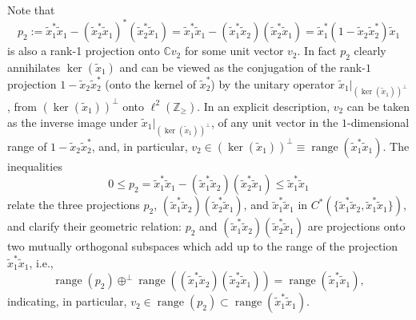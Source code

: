 \documentclass[11pt]{article}
\numberwithin{equation}{section}
\begin{document}
Note that
\[
p_{2}:=\tilde{x}_{1}^{\ast}\tilde{x}_{1}- ( \tilde{x}_{2}^{\ast}\tilde
{x}_{1} ) ^{\ast} ( \tilde{x}_{2}^{\ast}\tilde{x}_{1} )
=\tilde{x}_{1}^{\ast}\tilde{x}_{1}- ( \tilde{x}_{1}^{\ast}\tilde{x}%
_{2} ) ( \tilde{x}_{2}^{\ast}\tilde{x}_{1} ) =\tilde{x}%
_{1}^{\ast} ( 1-\tilde{x}_{2}\tilde{x}_{2}^{\ast} ) \tilde{x}_{1}%
\]
is also a rank-1 projection onto $\mathbb{C}v_{2}$ for some unit vector
$v_{2}$. In fact $p_{2}$ clearly annihilates $\ker ( \tilde{x}_{1} )
$ and can be viewed as the conjugation of the rank-$1$ projection $1-\tilde{x}_{2}\tilde{x}_{2}%
^{\ast}$ (onto the kernel of $\tilde{x}_{2}^{\ast}$) by the unitary
operator $\tilde{x}_{1}|_{( \ker( \tilde{x}_{1}))
^{\perp}}$, from $( \ker( \tilde{x}_{1})) ^{\perp}$
onto $\ell^{2}( \mathbb{Z}_{\geq}) $. In an explicit description, $v_{2}$
can be taken as the inverse image under $\tilde{x}_{1}|_{( \ker( \tilde{x}_{1})) ^{\perp}}$,
of any unit vector in the $1$-dimensional range of $1-\tilde{x}_{2}\tilde{x}%
_{2}^{\ast}$, and, in particular, $v_{2}\in( \ker( \tilde{x}
_{1})) ^{\perp}\equiv\operatorname{range}( \tilde{x}_{1}^{\ast}\tilde{x}_{1})$.
The inequalities
\[
0\leq p_{2}=\tilde{x}_{1}^{\ast}\tilde{x}_{1}-( \tilde{x}_{1}^{\ast
}\tilde{x}_{2}) ( \tilde{x}_{2}^{\ast}\tilde{x}_{1})
\leq\tilde{x}_{1}^{\ast}\tilde{x}_{1}
\]
relate the three projections $p_{2}$, $( \tilde{x}_{1}^{\ast}
\tilde{x}_{2}) ( \tilde{x}_{2}^{\ast}\tilde{x}_{1}) $, and
$\tilde{x}_{1}^{\ast}\tilde{x}_{1}$ in $C^{\ast}(\{ \tilde{x}
_{1}^{\ast}\tilde{x}_{2},\tilde{x}_{1}^{\ast}\tilde{x}_{1}\})
$, and clarify their geometric relation: $p_{2}$ and $( \tilde
{x}_{1}^{\ast}\tilde{x}_{2}) ( \tilde{x}_{2}^{\ast}\tilde{x}%
_{1}) $ are projections onto two mutually orthogonal subspaces which
add up to the range of the projection $\tilde{x}_{1}^{\ast}\tilde{x}_{1}$,
i.e.,
\[
\operatorname{range}( p_{2}) \oplus^{\perp}\operatorname{range}%
(( \tilde{x}_{1}^{\ast}\tilde{x}_{2}) ( \tilde
{x}_{2}^{\ast}\tilde{x}_{1})) =\operatorname{range}(
\tilde{x}_{1}^{\ast}\tilde{x}_{1}) ,
\]
indicating, in particular, $v_{2}\in\operatorname{range}( p_{2})
\subset\operatorname{range}( \tilde{x}_{1}^{\ast}\tilde{x}_{1})$.
\end{document}
